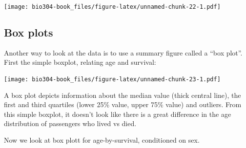 \documentclass[]{book}
\newenvironment{Shaded}{\begin{snugshade}}{\end{snugshade}}
\newcommand{\DataTypeTok}[1]{\textcolor[rgb]{0.13,0.29,0.53}{#1}}
\newcommand{\FloatTok}[1]{\textcolor[rgb]{0.00,0.00,0.81}{#1}}
\newcommand{\KeywordTok}[1]{\textcolor[rgb]{0.13,0.29,0.53}{\textbf{#1}}}
\newcommand{\NormalTok}[1]{#1}
\newcommand{\OperatorTok}[1]{\textcolor[rgb]{0.81,0.36,0.00}{\textbf{#1}}}
\newcommand{\StringTok}[1]{\textcolor[rgb]{0.31,0.60,0.02}{#1}}
\theoremstyle{definition}
\theoremstyle{definition}
\theoremstyle{definition}
\theoremstyle{remark}
\begin{document}
\begin{Shaded}
\end{Shaded}

\texttt{[image: bio304-book\_files/figure-latex/unnamed-chunk-22-1.pdf]}

\hypertarget{box-plots}{%
\subsection{Box plots}\label{box-plots}}

Another way to look at the data is to use a summary figure called a
``box plot''. First the simple boxplot, relating age and survival:

\begin{Shaded}
\end{Shaded}

\texttt{[image: bio304-book\_files/figure-latex/unnamed-chunk-23-1.pdf]}

A box plot depicts information about the median value (thick central
line), the first and third quartiles (lower 25\% value, upper 75\%
value) and outliers. From this simple boxplot, it doesn't look like
there is a great difference in the age distribution of passengers who
lived vs died.

Now we look at box plott for age-by-survival, conditioned on sex.

\begin{Shaded}
\end{Shaded}
\end{document}

